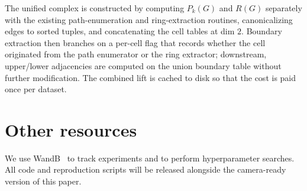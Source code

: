 \documentclass{article}
\begin{document}
The unified complex is constructed by computing $P_k(G)$ and $R(G)$ separately with the existing path-enumeration and ring-extraction routines, canonicalizing edges to sorted tuples, and concatenating the cell tables at dim $2$. Boundary extraction then branches on a per-cell flag that records whether the cell originated from the path enumerator or the ring extractor; downstream, upper/lower adjacencies are computed on the union boundary table without further modification. The combined lift is cached to disk so that the cost is paid once per dataset.

\section{Other resources}
\label{app:resources}
We use WandB~\citep{wandb} to track experiments and to perform hyperparameter searches. All code and reproduction scripts will be released alongside the camera-ready version of this paper.
\end{document}
